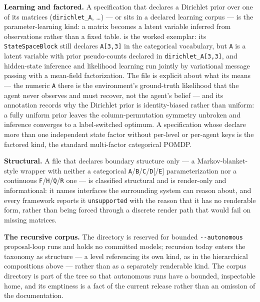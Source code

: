 \documentclass[
  english,
  9pt,
]{extarticle}
\begin{document}
\textbf{Learning and factored.} A specification that declares a
Dirichlet prior over one of its matrices (\texttt{dirichlet\_A}, \ldots)
--- or sits in a declared learning corpus --- is the parameter-learning
kind: a matrix becomes a latent variable inferred from observations
rather than a fixed table.
 is
the worked exemplar: its \texttt{StateSpaceBlock} still declares
\texttt{A{[}3,3{]}} in the categorical vocabulary, but \texttt{A} is a
latent variable with prior pseudo-counts declared in
\texttt{dirichlet\_A{[}3,3{]}}, and hidden-state inference and
likelihood learning run jointly by variational message passing with a
mean-field factorization. The file is explicit about what its
 means --- the numeric \texttt{A} there
is the environment's ground-truth likelihood that the agent never
observes and must recover, not the agent's belief --- and its annotation
records why the Dirichlet prior is identity-biased rather than uniform:
a fully uniform prior leaves the column-permutation symmetry unbroken
and inference converges to a label-switched optimum. A specification
whose  declare more than one independent
state factor without per-level or per-agent keys is the factored kind,
the standard multi-factor categorical POMDP.

\textbf{Structural.} A file that declares boundary structure only --- a
Markov-blanket-style wrapper with neither a categorical
\texttt{A}/\texttt{B}/\texttt{C}/\texttt{D}{[}/\texttt{E}{]}
parameterization nor a continuous
\texttt{F}/\texttt{H}/\texttt{Q}/\texttt{R} one --- is classified
structural and is render-only and informational: it names interfaces the
surrounding system can reason about, and every framework reports it
\texttt{unsupported} with the reason that it has no renderable form,
rather than being forced through a discrete render path that would fail
on missing matrices.

\textbf{The recursive corpus.} The 
directory is reserved for bounded \texttt{-\/-autonomous} proposal-loop
runs and holds no committed models; recursion today enters the taxonomy
as structure --- a level referencing its own kind, as in the
hierarchical compositions above --- rather than as a separately
renderable kind. The corpus directory is part of the tree so that
autonomous runs have a bounded, inspectable home, and its emptiness is a
fact of the current release rather than an omission of the
documentation.
\end{document}
